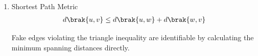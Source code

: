 \begin{enumerate}[label=\thesubsection.\arabic*, ref=\thesubsection.\theenumi]
	From the defined moments of a Binomial distribution:
	\begin{align}
		E\brak{X} &= np 
		\\
		var\brak{X} &= npq = np\brak{1-p} 
	\end{align}
	
	The sample proportion is given as $\hat{p} = \frac{X}{n}$. Evaluating the expectation yields:
	\begin{align}
		E\sbrak{\hat{p}} &= E\sbrak{\frac{X}{n}}
		\\
		&= \frac{1}{n} E\brak{X}
		\\
		&= \frac{1}{n} \brak{np} = p
	\end{align}
	
	To evaluate the variance, apply the fundamental variance scaling property $var\brak{aX} = a^2 var\brak{X}$ established in the text:
	\begin{align}
		var\brak{\hat{p}} &= var\brak{\frac{X}{n}}
		\\
		&= \frac{1}{n^2} var\brak{X}
		\\
		&= \frac{1}{n^2} \sbrak{np\brak{1-p}}
		\\
		&= \frac{p\brak{1-p}}{n}
	\end{align}
	
	Because $n$ is in the denominator of the resulting expression, the variance of $\hat{p}$ strictly decreases as the total number of independent coin tosses $n$ increases.
	\item Shortest Path Metric
	\begin{align}
		d\brak{u,v} \le d\brak{u,w} + d\brak{w,v} \label{eq:DA2025-triangle_ineq}
	\end{align}
	
	Fake edges violating the triangle inequality are identifiable by calculating the minimum spanning distances directly.
	

\end{enumerate}

